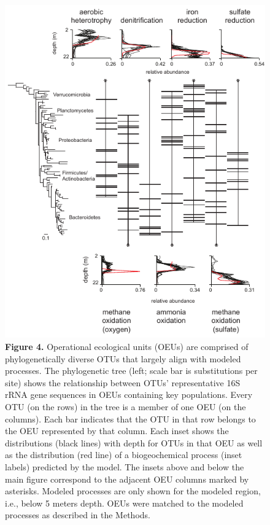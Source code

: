 \begin{figure}[ht]
\centering
\includegraphics{lake/fig/fig4}
\caption*{{\bf Figure 4.} Operational ecological units (OEUs) are comprised of
phylogenetically diverse OTUs that largely align with modeled processes. The
phylogenetic tree (left; scale bar is substitutions per site) shows the
relationship between OTUs' representative 16S rRNA gene sequences in OEUs
containing key populations. Every OTU (on the rows) in the tree is a member of
one OEU (on the columns). Each bar indicates that the OTU in that row belongs
to the OEU represented by that column. Each inset shows the distributions
(black lines) with depth for OTUs in that OEU as well as the distribution (red
line) of a biogeochemical process (inset labels) predicted by the model. The
insets above and below the main figure correspond to the adjacent OEU columns
marked by asterisks. Modeled processes are only shown for the modeled region,
i.e., below 5 meters depth. OEUs were matched to the modeled processes as
described in the Methods.}
\end{figure}


